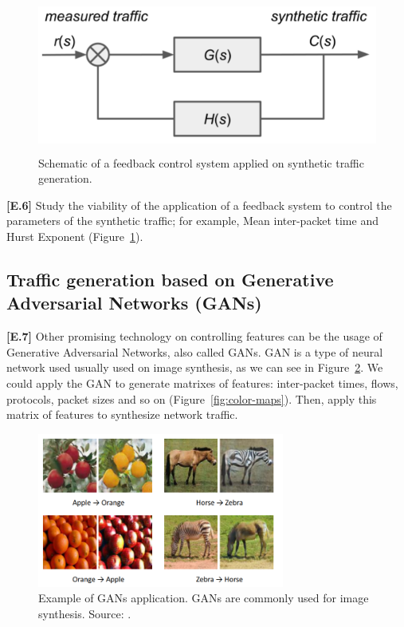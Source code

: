 \begin{figure}[!ht]
    \centering
    \includegraphics[height=2.0in]{figures/ch6/control-system}
    \caption{Schematic of a feedback control system applied on synthetic traffic generation.}
    \label{fig:control-system}
\end{figure}

\textbf{[E.6]} Study the viability of the application of a feedback system to control the parameters of the synthetic traffic; for example, Mean inter-packet time and Hurst Exponent (Figure~\ref{fig:control-system}).

\subsection{Traffic generation based on Generative Adversarial Networks (GANs)}

\textbf{[E.7]} Other promising technology on controlling features can be the usage of Generative Adversarial Networks, also called \acrshort{GAN}s\cite{gans-paper}. GAN is a type of neural network used usually used on image synthesis, as we can see in Figure~\ref{fig:gans-example}. We could apply the GAN to generate matrixes of features: inter-packet times, flows, protocols, packet sizes and so on (Figure~\ref{fig:color-maps}). Then, apply this matrix of features to synthesize network traffic. 

\begin{figure}[!ht]
    \centering
    \includegraphics[height=2.0in]{figures/ch6/gans-example}
    \caption{Example of GANs application. GANs are commonly used for image synthesis. Source: \cite{gans-survey}. }
    \label{fig:gans-example}
\end{figure}

